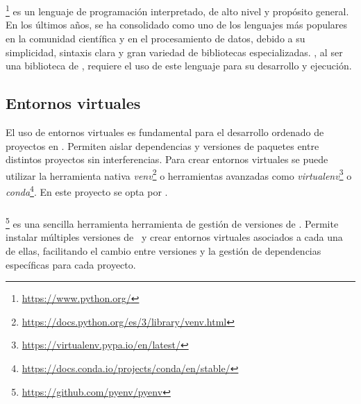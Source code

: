 \pagestyle{fancy}
\fancyhead[l]{\autorUO}
\fancyfoot[l]{\asignaturaAbbr}
\fancyfoot[r]{\fecha}

\section{\python} \label{sec:intro_python}
\python\footnote{\url{https://www.python.org/}} es un lenguaje de programación interpretado, de alto nivel y propósito general. 
En los últimos años, se ha consolidado como uno de los lenguajes más populares en la comunidad científica y en el procesamiento de datos,
debido a su simplicidad, sintaxis clara y gran variedad de bibliotecas especializadas. \pytorch, al ser una biblioteca de \python,
requiere el uso de este lenguaje para su desarrollo y ejecución.

\subsection{Entornos virtuales} \label{sec:intro_virtualenv}
El uso de entornos virtuales es fundamental para el desarrollo ordenado de proyectos en \python. Permiten aislar dependencias y versiones 
de paquetes entre distintos proyectos sin interferencias. Para crear entornos virtuales se puede utilizar la herramienta nativa 
\textit{venv}\footnote{\url{https://docs.python.org/es/3/library/venv.html}} o herramientas avanzadas como 
\textit{virtualenv}\footnote{\url{https://virtualenv.pypa.io/en/latest/}} o \textit{conda}\footnote{\url{https://docs.conda.io/projects/conda/en/stable/}}.
En este proyecto se opta por \pyenv.

\subsubsection{\pyenv} \label{sec:intro_pyenv}
\pyenv\footnote{\url{https://github.com/pyenv/pyenv}} es una sencilla herramienta herramienta de gestión de versiones de \python.
Permite instalar múltiples versiones de \python\ y crear entornos virtuales asociados a cada una de ellas, facilitando
el cambio entre versiones y la gestión de dependencias específicas para cada proyecto. 

